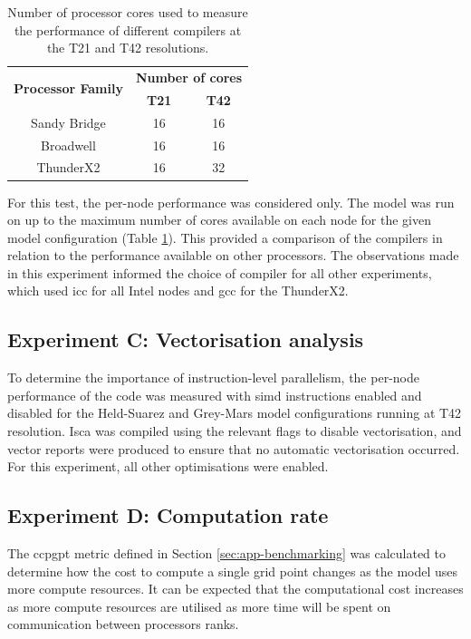 \documentclass[a4paper,11pt]{report}
\begin{document}
\begin{table}[htp]
\caption[Number of processor cores used to measure the performance of different compilers]{Number of processor cores used to measure the performance of different compilers at the T21 and T42 resolutions.}
\begin{center}
\begin{tabular}{c c c}
\toprule
\multirow{2}{*}{\textbf{Processor Family}}	&	\multicolumn{2}{c}{\textbf{Number of cores}}	\\
							 		\cmidrule(lr){2-3}
								& 	\textbf{T21} 	&	\textbf{T42}			\\
\midrule
Sandy Bridge						&	16			&	16					\\
Broadwell							&	16			&	16					\\
ThunderX2						&	16			&	32					\\
\bottomrule
\end{tabular}
\end{center}
\label{tbl:-compiler-cores}
\end{table}%

\par

For this test, the per-node performance was considered only. The model was run on up to the maximum number of cores available on each node for the given model configuration (Table \ref{tbl:-compiler-cores}). This provided a comparison of the compilers in relation to the performance available on other processors. The observations made in this experiment informed the choice of compiler for all other experiments, which used \gls{icc} for all Intel nodes and \gls{gcc} for the ThunderX2.

\subsection{Experiment C: Vectorisation analysis}
To determine the importance of instruction-level parallelism, the per-node performance of the code was measured with \gls{simd} instructions enabled and disabled for the Held-Suarez and Grey-Mars model configurations running at T42 resolution. Isca was compiled using the relevant flags to disable vectorisation, and vector reports were produced to ensure that no automatic vectorisation occurred. For this experiment, all other optimisations were enabled.

\subsection{Experiment D: Computation rate}
The \gls{ccpgpt} metric defined in Section \ref{sec:app-benchmarking} was calculated to determine how the cost to compute a single grid point changes as the model uses more compute resources. It can be expected that the computational cost increases as more compute resources are utilised as more time will be spent on communication between processors ranks. 
\end{document}
